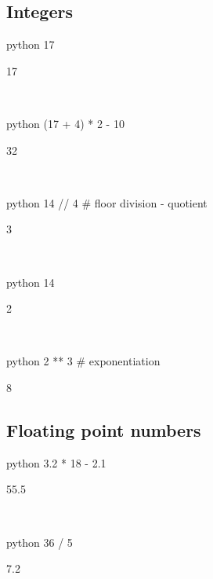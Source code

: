 \documentclass[aspectratio=1610,slidestop]{beamer}
\begin{document}
\subsection{Integers}
\begin{pframe}
 \begin{ipython}
  \begin{pythonin}{python}
17
  \end{pythonin}
  \begin{pythonout}
17
  \end{pythonout}
  \\

  \begin{pythonin}{python}
(17 + 4) * 2 - 10
  \end{pythonin}
  \begin{pythonout}
32
  \end{pythonout}
  \\

  \begin{pythonin}{python}
14 // 4  # floor division - quotient
  \end{pythonin}
  \begin{pythonout}
3
  \end{pythonout}
  \\

  \begin{pythonin}{python}
14 %
  \end{pythonin}
  \begin{pythonout}
2
  \end{pythonout}
  \\

  \begin{pythonin}{python}
2 ** 3   # exponentiation
  \end{pythonin}
  \begin{pythonout}
8
  \end{pythonout}
 \end{ipython}
\end{pframe}


\subsection{Floating point numbers}
\begin{pframe}
 \begin{ipython}
  \begin{pythonin}{python}
3.2 * 18 - 2.1
  \end{pythonin}
  \begin{pythonout}
55.5
  \end{pythonout}
  \\

  \begin{pythonin}{python}
36 / 5
  \end{pythonin}
  \begin{pythonout}
7.2
  \end{pythonout}
 \end{ipython}
\end{pframe}
\end{document}
